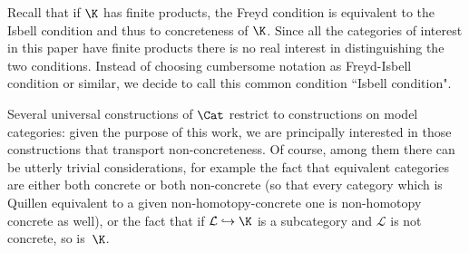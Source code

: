 \begin{remark}
Recall that if $\K$ has finite products, the Freyd condition is equivalent to the Isbell condition and thus to concreteness of $\K$. Since all the categories of interest in this paper have finite products there is no real interest in distinguishing the two conditions. Instead of choosing cumbersome notation as Freyd-Isbell condition or similar, we decide to call this common condition ``Isbell condition".
\end{remark}

Several universal constructions of $\Cat$ restrict to constructions on model categories: given the purpose of this work, we are principally interested in those constructions that transport non-concreteness. Of course, among them there can be utterly trivial considerations, for example the fact that equivalent categories are either both concrete or both non-concrete (so that every category which is Quillen equivalent to a given non-homotopy\hyp{}concrete one is non-homotopy concrete as well), or the fact that if $\mathcal{L}\hookrightarrow \K$ is a subcategory and $\mathcal{L}$ is not concrete, so is~$\K$.

